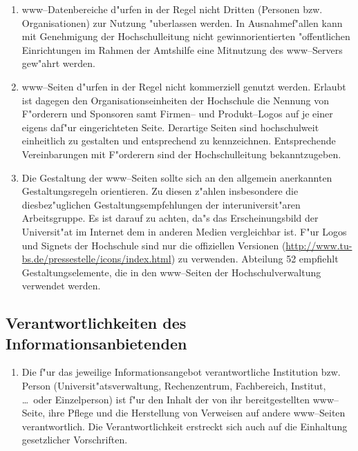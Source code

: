 \documentclass[12pt,titlepage,twoside]{scrartcl}
\begin{document}
\begin{appendix}
\begin{enumerate}
  \item www--Datenbereiche d"urfen in der Regel nicht Dritten (Personen
        bzw. Organisationen) zur Nutzung "uberlassen werden. In
        Ausnahmef"allen kann mit Genehmigung der Hochschulleitung
        nicht gewinnorientierten "offentlichen Einrichtungen im
        Rahmen der Amtshilfe eine Mitnutzung des www--Servers gew"ahrt
        werden.

  \item www--Seiten d"urfen in der Regel nicht kommerziell genutzt
        werden. Erlaubt ist dagegen den Organisationseinheiten der
        Hochschule die Nennung von F"orderern und Sponsoren samt
        Firmen-- und Produkt--Logos auf je einer eigens daf"ur
        eingerichteten Seite. Derartige Seiten sind hochschulweit
        einheitlich zu gestalten und entsprechend zu kennzeichnen.
        Entsprechende Vereinbarungen mit F"orderern sind der
        Hochschulleitung bekanntzugeben.

  \item Die Gestaltung der www--Seiten sollte sich an den allgemein
        anerkannten Gestaltungsregeln orientieren. Zu diesen
        z"ahlen insbesondere die diesbez"uglichen Gestaltungsempfehlungen
        der interuniversit"aren Arbeitsgruppe. Es ist darauf zu
        achten, da"s das Erscheinungsbild der Universit"at
        im Internet dem in anderen Medien vergleichbar ist. F"ur
        Logos und Signets der Hochschule sind nur die offiziellen
        Versionen (\url{http://www.tu-bs.de/pressestelle/icons/index.html})
        zu verwenden. Abteilung 52 empfiehlt Gestaltungselemente,
        die in den www--Seiten der Hochschulverwaltung verwendet werden.
\end{enumerate}

\subsection{Verantwortlichkeiten des Informationsanbietenden}

\begin{enumerate}
  \item Die f"ur das jeweilige Informationsangebot verantwortliche
        Institution bzw. Person (Universit"atsverwaltung,
        Rechenzentrum, Fachbereich, Institut, \dots\  oder Einzelperson) ist
        f"ur den Inhalt der von ihr bereitgestellten www--Seite,
        ihre Pflege und die Herstellung von Verweisen auf andere
        www--Seiten verantwortlich. Die Verantwortlichkeit erstreckt
        sich auch auf die Einhaltung gesetzlicher Vorschriften.


\end{enumerate}
\end{appendix}
\end{document}

